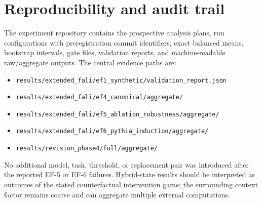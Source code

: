 \documentclass[pdflatex,sn-mathphys-ay]{sn-jnl}
\begin{document}
\section{Reproducibility and audit trail}

The experiment repository contains the prospective analysis plans, run
configurations with preregistration commit identifiers, exact balanced means,
bootstrap intervals, gate files, validation reports, and machine-readable raw/aggregate
outputs. The central evidence paths are:

\begin{itemize}
\item \texttt{results/extended\_fali/ef1\_synthetic/validation\_report.json}
\item \texttt{results/extended\_fali/ef4\_canonical/aggregate/}
\item \texttt{results/extended\_fali/ef5\_ablation\_robustness/aggregate/}
\item \texttt{results/extended\_fali/ef6\_pythia\_induction/aggregate/}
\item \texttt{results/revision\_phase4/full/aggregate/}
\end{itemize}

No additional model, task, threshold, or replacement pair was introduced after the
reported EF-5 or EF-6 failures. Hybrid-state results should be interpreted as outcomes
of the stated counterfactual intervention game; the surrounding context factor remains
coarse and can aggregate multiple external computations.


\end{document}
